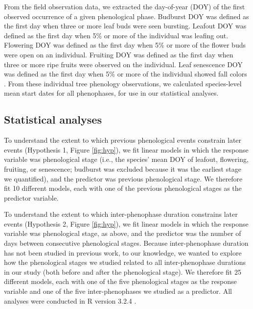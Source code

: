 \documentclass{article}
\begin{document}
\par From the field observation data, we extracted the day-of-year (DOY) of the first observed occurrence of a given phenological phase. Budburst DOY was defined as the first day when three or more leaf buds were seen bursting. Leafout DOY was defined as the first day when 5\% or more of the individual was leafing out. Flowering DOY was defined as the first day when 5\% or more of the flower buds were open on an individual. Fruiting DOY was defined as the first day when three or more ripe fruits were observed on the individual. Leaf senescence DOY was defined as the first day when 5\% or more of the individual showed fall colors \citep{denny2014}. 
From these individual tree phenology observations, we calculated species-level mean start dates for all phenophases, for use in our statistical analyses. 
\subsection*{Statistical analyses}
To understand the extent to which previous phenological events constrain later events (Hypothesis 1, Figure \ref{fig:hyp}), we fit linear models in which the response variable was phenological stage (i.e., the species' mean DOY of leafout, flowering, fruiting, or senescence; budburst was excluded because it was the earliest stage we quantified), and the predictor was previous phenological stage.  We therefore fit 10 different models, each with one of the previous phenological stages as the predictor variable. 
\par To understand the extent to which inter-phenophase duration constrains later events (Hypothesis 2, Figure \ref{fig:hyp}), we fit linear models in which the response variable was phenological stage, as above, and the predictor was the number of days between consecutive phenological stages. Because inter-phenophase duration has not been studied in previous work, to our knowledge, we wanted to explore how the phenological stages we studied related to all inter-phenophase durations in our study (both before and after the phenological stage). We therefore fit 25 different models, each with one of the five phenological stages as the response variable and one of the five inter-phenophases we studied as a predictor.
All analyses were conducted in R version 3.2.4 \citep{rcoreteam2016}.
\end{document}
